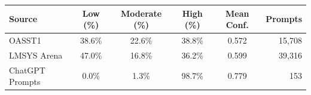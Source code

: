 \begin{tabular}{@{}lccccr@{}}
\toprule
Source & Low (\%) & Moderate (\%) & High (\%) & Mean Conf. & Prompts \\
\midrule
OASST1 & 38.6\% & 22.6\% & 38.8\% & 0.572 & 15,708 \\
LMSYS Arena & 47.0\% & 16.8\% & 36.2\% & 0.599 & 39,316 \\
ChatGPT Prompts & 0.0\% & 1.3\% & 98.7\% & 0.779 & 153 \\
\bottomrule
\end{tabular}